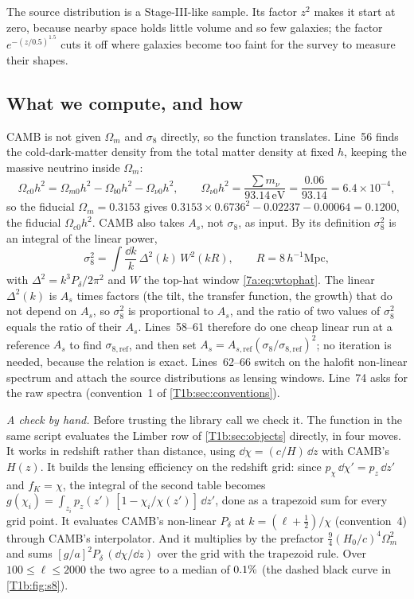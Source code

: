 The source distribution is a Stage-III-like sample. Its factor $z^2$ makes it start at zero, because nearby space holds little volume and so few galaxies; the factor $e^{-(z/0.5)^{1.5}}$ cuts it off where galaxies become too faint for the survey to measure their shapes.

\subsection{What we compute, and how}
\label{T1b:sec:s8-code}


CAMB is not given $\Omega_m$ and $\sigma_8$ directly, so the function translates. Line~56 finds the cold-dark-matter density from the total matter density at fixed $h$, keeping the massive neutrino inside $\Omega_m$:
\[
\Omega_{c0}h^2=\Omega_{m0}h^2-\Omega_{b0}h^2-\Omega_{\nu0}h^2,\qquad
\Omega_{\nu0}h^2=\frac{\sum m_\nu}{93.14\,\mathrm{eV}}=\frac{0.06}{93.14}=6.4\times10^{-4},
\]
so the fiducial $\Omega_m=0.3153$ gives $0.3153\times0.6736^2-0.02237-0.00064=0.1200$, the fiducial $\Omega_{c0}h^2$. CAMB also takes $A_s$, not $\sigma_8$, as input. By its definition $\sigma_8^2$ is an integral of the linear power,
\[
\sigma_8^2=\int\frac{\dd k}{k}\,\Delta^2(k)\,W^2(kR),\qquad R=8\,h^{-1}\mathrm{Mpc},
\]
with $\Delta^2=k^3P_\delta/2\pi^2$ and $W$ the top-hat window \eqref{7a:eq:wtophat}. The linear $\Delta^2(k)$ is $A_s$ times factors (the tilt, the transfer function, the growth) that do not depend on $A_s$, so $\sigma_8^2$ is proportional to $A_s$, and the ratio of two values of $\sigma_8^2$ equals the ratio of their $A_s$. Lines~58--61 therefore do one cheap linear run at a reference $A_s$ to find $\sigma_{8,\mathrm{ref}}$, and then set $A_s=A_{s,\mathrm{ref}}(\sigma_8/\sigma_{8,\mathrm{ref}})^2$; no iteration is needed, because the relation is exact. Lines~62--66 switch on the halofit non-linear spectrum and attach the source distributions as lensing windows. Line~74 asks for the raw spectra (convention~1 of \cref{T1b:sec:conventions}).

\emph{A check by hand.} Before trusting the library call we check it. The function  in the same script evaluates the Limber row of \cref{T1b:sec:objects} directly, in four moves. It works in redshift rather than distance, using $\dd\chi=(c/H)\,\dd z$ with CAMB's $H(z)$. It builds the lensing efficiency on the redshift grid: since $p_\chi\,\dd\chi'=p_z\,\dd z'$ and $f_K=\chi$, the integral of the second table becomes $g(\chi_i)=\int_{z_i}p_z(z')\,[1-\chi_i/\chi(z')]\,\dd z'$, done as a trapezoid sum for every grid point. It evaluates CAMB's non-linear $P_\delta$ at $k=(\ell+\frac12)/\chi$ (convention~4) through CAMB's interpolator. And it multiplies by the prefactor $\frac94(H_0/c)^4\Omega_m^2$ and sums $[g/a]^2P_\delta\,(\dd\chi/\dd z)$ over the grid with the trapezoid rule. Over $100\le\ell\le2000$ the two agree to a median of $0.1\%$ (the dashed black curve in \cref{T1b:fig:s8}).

